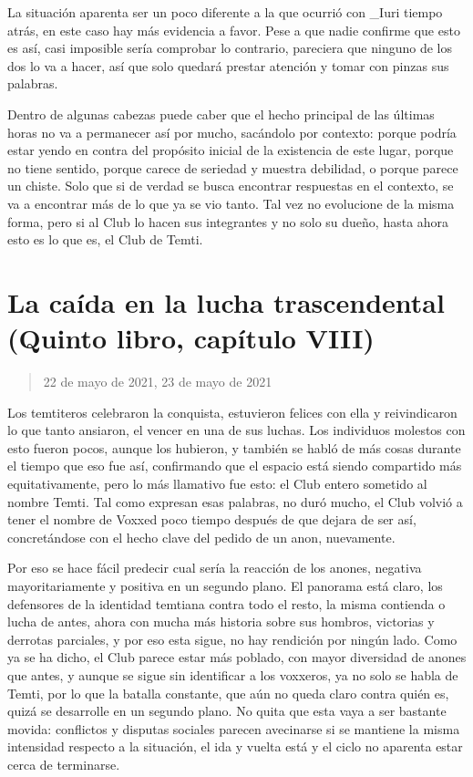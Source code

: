\documentclass[
  spanish,
]{book}
\begin{document}
La situación aparenta ser un poco diferente a la que ocurrió con \_Iuri tiempo atrás, en este caso hay más evidencia a favor. Pese a que nadie confirme que esto es así, casi imposible sería comprobar lo contrario, pareciera que ninguno de los dos lo va a hacer, así que solo quedará prestar atención y tomar con pinzas sus palabras.

Dentro de algunas cabezas puede caber que el hecho principal de las últimas horas no va a permanecer así por mucho, sacándolo por contexto: porque podría estar yendo en contra del propósito inicial de la existencia de este lugar, porque no tiene sentido, porque carece de seriedad y muestra debilidad, o porque parece un chiste. Solo que si de verdad se busca encontrar respuestas en el contexto, se va a encontrar más de lo que ya se vio tanto. Tal vez no evolucione de la misma forma, pero si al Club lo hacen sus integrantes y no solo su dueño, hasta ahora esto es lo que es, el Club de Temti.

\hypertarget{la-cauxedda-en-la-lucha-trascendental-quinto-libro-capuxedtulo-viii}{%
\section{La caída en la lucha trascendental (Quinto libro, capítulo VIII)}\label{la-cauxedda-en-la-lucha-trascendental-quinto-libro-capuxedtulo-viii}}

\begin{quote}
22 de mayo de 2021, 23 de mayo de 2021
\end{quote}

Los temtiteros celebraron la conquista, estuvieron felices con ella y reivindicaron lo que tanto ansiaron, el vencer en una de sus luchas. Los individuos molestos con esto fueron pocos, aunque los hubieron, y también se habló de más cosas durante el tiempo que eso fue así, confirmando que el espacio está siendo compartido más equitativamente, pero lo más llamativo fue esto: el Club entero sometido al nombre Temti. Tal como expresan esas palabras, no duró mucho, el Club volvió a tener el nombre de Voxxed poco tiempo después de que dejara de ser así, concretándose con el hecho clave del pedido de un anon, nuevamente.

Por eso se hace fácil predecir cual sería la reacción de los anones, negativa mayoritariamente y positiva en un segundo plano. El panorama está claro, los defensores de la identidad temtiana contra todo el resto, la misma contienda o lucha de antes, ahora con mucha más historia sobre sus hombros, victorias y derrotas parciales, y por eso esta sigue, no hay rendición por ningún lado. Como ya se ha dicho, el Club parece estar más poblado, con mayor diversidad de anones que antes, y aunque se sigue sin identificar a los voxxeros, ya no solo se habla de Temti, por lo que la batalla constante, que aún no queda claro contra quién es, quizá se desarrolle en un segundo plano. No quita que esta vaya a ser bastante movida: conflictos y disputas sociales parecen avecinarse si se mantiene la misma intensidad respecto a la situación, el ida y vuelta está y el ciclo no aparenta estar cerca de terminarse.
\end{document}
